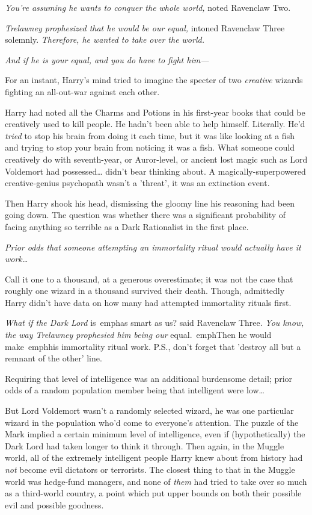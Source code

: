 \emph{You're assuming he wants to conquer the whole world,} noted Ravenclaw Two.

\emph{Trelawney prophesized that he would be our equal,} intoned Ravenclaw 
Three solemnly. \emph{Therefore, he wanted to take over the world.}

\emph{And if he is your equal, and you do have to fight him---}

For an instant, Harry's mind tried to imagine the specter of two 
\emph{creative} wizards fighting an all-out-war against each other.

Harry had noted all the Charms and Potions in his first-year books that could 
be creatively used to kill people. He hadn't been able to help himself. 
Literally. He'd \emph{tried} to stop his brain from doing it each time, but it 
was like looking at a fish and trying to stop your brain from noticing it was a 
fish. What someone could creatively do with seventh-year, or Auror-level, or 
ancient lost magic such as Lord Voldemort had possessed{\ldots} didn't bear 
thinking about. A magically-superpowered creative-genius psychopath wasn't a 
'threat', it was an extinction event.

Then Harry shook his head, dismissing the gloomy line his reasoning had been 
going down. The question was whether there was a significant probability of 
facing anything so terrible as a Dark Rationalist in the first place.

\emph{Prior odds that someone attempting an immortality ritual would actually 
have it work{\ldots}}

Call it one to a thousand, at a generous overestimate; it was not the case that 
roughly one wizard in a thousand survived their death. Though, admittedly Harry 
didn't have data on how many had attempted immortality rituals first.

\emph{What if the Dark Lord} is\ emph{as smart as us?} said Ravenclaw Three. 
\emph{You know, the way Trelawney prophesied him being our} equal.\ emph{Then 
he would} make\ emph{his immortality ritual work. P.S., don't forget that 
'destroy all but a remnant of the other' line.}

Requiring that level of intelligence was an additional burdensome detail; prior 
odds of a random population member being that intelligent were low{\ldots}

But Lord Voldemort wasn't a randomly selected wizard, he was one particular 
wizard in the population who'd come to everyone's attention. The puzzle of the 
Mark implied a certain minimum level of intelligence, even if (hypothetically) 
the Dark Lord had taken longer to think it through. Then again, in the Muggle 
world, all of the extremely intelligent people Harry knew about from history 
had \emph{not} become evil dictators or terrorists. The closest thing to that 
in the Muggle world was hedge-fund managers, and none of \emph{them} had tried 
to take over so much as a third-world country, a point which put upper bounds 
on both their possible evil and possible goodness.

